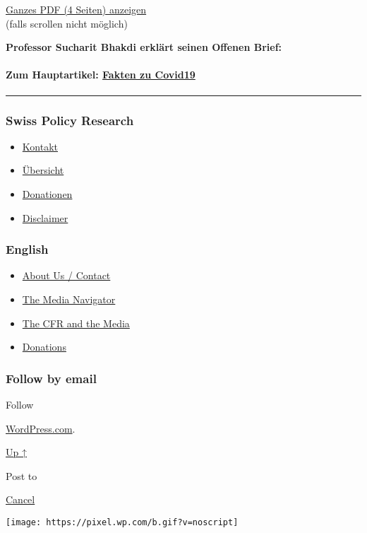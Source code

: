 \href{https://swprs.files.wordpress.com/2020/03/sucharit-bhakdi-letter-merkel.pdf}{Ganzes
PDF (4 Seiten) anzeigen}\\
(falls scrollen nicht möglich)

\textbf{Professor Sucharit Bhakdi erklärt seinen Offenen Brief:}

\hypertarget{zum-hauptartikel-fakten-zu-covid19}{%
\paragraph{\texorpdfstring{Zum Hauptartikel:
\href{https://swprs.org/covid-19-hinweis-ii/}{Fakten zu
Covid19}}{Zum Hauptartikel: Fakten zu Covid19}}\label{zum-hauptartikel-fakten-zu-covid19}}

\begin{center}\rule{0.5\linewidth}{\linethickness}\end{center}

\hypertarget{swiss-policy-research}{%
\subsubsection{Swiss Policy Research}\label{swiss-policy-research}}

\begin{itemize}
\tightlist
\item
  \href{https://swprs.org/kontakt/}{Kontakt}
\item
  \href{https://swprs.org/uebersicht/}{Übersicht}
\item
  \href{https://swprs.org/donationen/}{Donationen}
\item
  \href{https://swprs.org/disclaimer/}{Disclaimer}
\end{itemize}

\hypertarget{english}{%
\subsubsection{English}\label{english}}

\begin{itemize}
\tightlist
\item
  \href{https://swprs.org/contact/}{About Us / Contact}
\item
  \href{https://swprs.org/media-navigator/}{The Media Navigator}
\item
  \href{https://swprs.org/the-american-empire-and-its-media/}{The CFR
  and the Media}
\item
  \href{https://swprs.org/donations/}{Donations}
\end{itemize}

\hypertarget{follow-by-email}{%
\subsubsection{Follow by email}\label{follow-by-email}}

Follow

\href{https://wordpress.com/?ref=footer_custom_com}{WordPress.com}.

\protect\hyperlink{}{Up ↑}

Post to

\protect\hyperlink{}{Cancel}

\texttt{[image: https://pixel.wp.com/b.gif?v=noscript]}
